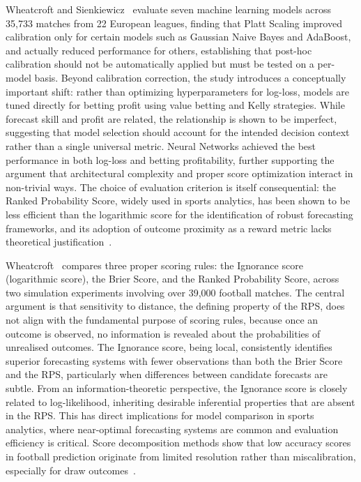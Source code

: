 \documentclass[conference]{IEEEtran}
\begin{document}
Wheatcroft and Sienkiewicz~\cite{b6} evaluate seven machine
learning models across 35,733 matches from 22 European leagues,
finding that Platt Scaling improved calibration only for certain
models such as Gaussian Naive Bayes and AdaBoost, and actually
reduced performance for others, establishing that post-hoc
calibration should not be automatically applied but must be tested
on a per-model basis. Beyond calibration correction, the study
introduces a conceptually important shift: rather than optimizing
hyperparameters for log-loss, models are tuned directly for
betting profit using value betting and Kelly strategies. While
forecast skill and profit are related, the relationship is shown
to be imperfect, suggesting that model selection should account
for the intended decision context rather than a single universal
metric. Neural Networks achieved the best performance in both
log-loss and betting profitability, further supporting the
argument that architectural complexity and proper score
optimization interact in non-trivial ways.
The choice of evaluation criterion is itself consequential: the
Ranked Probability Score, widely used in sports analytics, has
been shown to be less efficient than the logarithmic score for
the identification of robust forecasting frameworks, and its
adoption of outcome proximity as a reward metric lacks theoretical
justification~\cite{b7}.

Wheatcroft~\cite{b7} compares three proper scoring rules: the
Ignorance score (logarithmic score), the Brier Score, and the
Ranked Probability Score, across two simulation experiments
involving over 39,000 football matches. The central argument is
that sensitivity to distance, the defining property of the RPS,
does not align with the fundamental purpose of scoring rules,
because once an outcome is observed, no information is revealed
about the probabilities of unrealised outcomes. The Ignorance
score, being local, consistently identifies superior forecasting
systems with fewer observations than both the Brier Score and the
RPS, particularly when differences between candidate forecasts
are subtle. From an information-theoretic perspective, the
Ignorance score is closely related to log-likelihood, inheriting
desirable inferential properties that are absent in the RPS. This
has direct implications for model comparison in sports analytics,
where near-optimal forecasting systems are common and evaluation
efficiency is critical.
Score decomposition methods show that low accuracy scores in
football prediction originate from limited resolution rather than
miscalibration, especially for draw outcomes~\cite{b11}.
\end{document}
